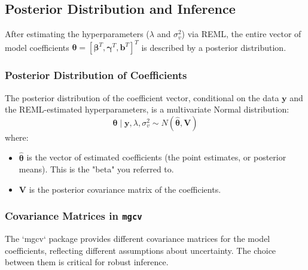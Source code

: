 \documentclass[11pt, a4paper]{article}
\begin{document}
\subsection{Posterior Distribution and Inference}

After estimating the hyperparameters ($\lambda$ and $\sigma_v^2$) via REML, the entire vector of model coefficients $\boldsymbol{\theta} = [\boldsymbol{\beta}^T, \boldsymbol{\gamma}^T, \mathbf{b}^T]^T$ is described by a posterior distribution.

\subsubsection{Posterior Distribution of Coefficients}
The posterior distribution of the coefficient vector, conditional on the data $\mathbf{y}$ and the REML-estimated hyperparameters, is a multivariate Normal distribution:
\begin{equation*}
    \boldsymbol{\theta} \mid \mathbf{y}, \lambda, \sigma_v^2 \sim N(\hat{\boldsymbol{\theta}}, \mathbf{V})
\end{equation*}
where:
\begin{itemize}
    \item $\hat{\boldsymbol{\theta}}$ is the vector of estimated coefficients (the point estimates, or posterior means). This is the "beta" you referred to.
    \item $\mathbf{V}$ is the posterior covariance matrix of the coefficients.
\end{itemize}

\subsubsection{Covariance Matrices in \texttt{mgcv}}
The `mgcv` package provides different covariance matrices for the model coefficients, reflecting different assumptions about uncertainty. The choice between them is critical for robust inference.
\end{document}
